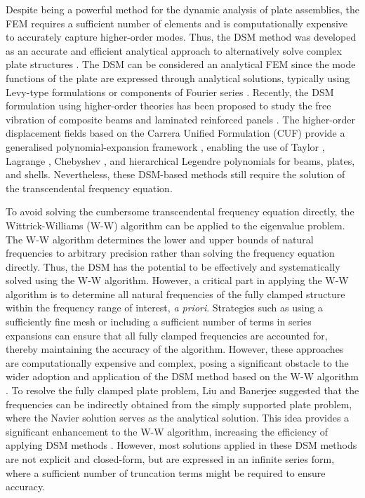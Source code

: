 \documentclass[preprint,12pt,number]{elsarticle}
\begin{document}
Despite being a powerful method for the dynamic analysis of plate assemblies, the FEM requires a sufficient number of elements and is computationally expensive to accurately capture higher-order modes.
Thus, the DSM method was developed as an accurate and efficient analytical approach to alternatively solve complex plate structures \cite{boscolo2011dynamic,fazzolari2013exact}. 
The DSM can be considered an analytical FEM since the mode functions of the plate are expressed through analytical solutions, typically using Levy-type formulations \cite{ghorbel2015dynamic} or components of Fourier series \cite{williams1995wave,banerjee2015dynamic,liu2016free,liu2024wavenumber,zhou2024wavenumber}.
Recently, the DSM formulation using higher-order theories has been proposed to study the free vibration of composite beams and laminated reinforced panels \cite{liu2024dynamic,liu2024free}.
The higher-order displacement fields based on the Carrera Unified Formulation (CUF) provide a generalised polynomial-expansion framework \cite{carrera2024carrera}, enabling the use of Taylor \cite{pagani2014free}, Lagrange \cite{carrera2012refined}, Chebyshev \cite{filippi2015static}, and hierarchical Legendre polynomials \cite{carrera2017hierarchical} for beams, plates, and shells.
Nevertheless, these DSM-based methods still require the solution of the transcendental frequency equation.

To avoid solving the cumbersome transcendental frequency equation directly, the Wittrick-Williams (W-W) algorithm \cite{wittrick1971general} can be applied to the eigenvalue problem.
The W-W algorithm determines the lower and upper bounds of natural frequencies to arbitrary precision rather than solving the frequency equation directly. 
Thus, the DSM has the potential to be effectively and systematically solved using the W-W algorithm.
However, a critical part in applying the W-W algorithm is to determine all natural frequencies of the fully clamped structure within the frequency range of interest, \textit{a priori}.
Strategies such as using a sufficiently fine mesh or including a sufficient number of terms in series expansions \cite{banerjee2015dynamic} can ensure that all fully clamped frequencies are accounted for, thereby maintaining the accuracy of the algorithm. 
However, these approaches are computationally expensive and complex, posing a significant obstacle to the wider adoption and application of the DSM method based on the W-W algorithm \cite{han2018improved,liu2022closed}.
To resolve the fully clamped plate problem, Liu and Banerjee \cite{liu2015exact} suggested that the frequencies can be indirectly obtained from the simply supported plate problem, where the Navier solution serves as the analytical solution. 
This idea provides a significant enhancement to the W-W algorithm, increasing the efficiency of applying DSM methods \cite{liu2024wavenumber,zhou2024wavenumber}. 
However, most solutions applied in these DSM methods are not explicit and closed-form, but are expressed in an infinite series form, where a sufficient number of truncation terms might be required to ensure accuracy.
\end{document}
